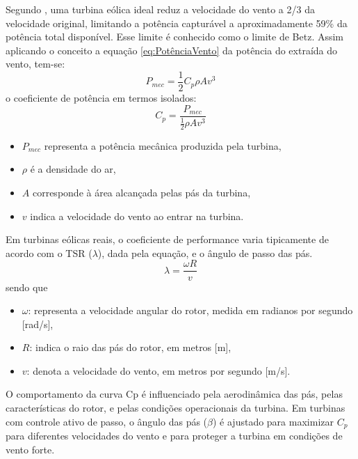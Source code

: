     \par Segundo , uma turbina eólica ideal reduz a velocidade do vento a 2/3 da velocidade original, limitando a potência capturável a aproximadamente 59\% da potência total disponível. Esse limite é conhecido como o limite de Betz. Assim aplicando o conceito a equação \ref{eq:PotênciaVento} da potência do extraída do vento, tem-se:
    \begin{equation}
        P_{mec} = \frac{1}{2} C_p \rho A v^3 
    \end{equation}
    o coeficiente de potência em termos isolados:
    \begin{equation}
        C_p = \frac{P_{mec}}{\frac{1}{2} \rho A v^3}
        \label{eq:CoeficienteDePotência}
    \end{equation}
    \begin{itemize}
        \item \( P_{mec} \) representa a potência mecânica produzida pela turbina,
        \item \( \rho \) é a densidade do ar,
        \item \( A \) corresponde à área alcançada pelas pás da turbina,
        \item \( v \) indica a velocidade do vento ao entrar na turbina.
    \end{itemize}
    \par Em turbinas eólicas reais, o coeficiente de performance varia tipicamente de acordo com o TSR ($\lambda$), dada pela equação, e o ângulo de passo das pás. 
    \begin{equation}
        \lambda = \frac{\omega R}{v}
        \label{eq:lambda}
    \end{equation}
    sendo que
    \begin{itemize}
        \item \( \omega \): representa a velocidade angular do rotor, medida em radianos por segundo [rad/s],
        \item \( R \): indica o raio das pás do rotor, em metros [m],
        \item \( v \): denota a velocidade do vento, em metros por segundo [m/s].
    \end{itemize}
   

    \par O comportamento da curva Cp é influenciado pela aerodinâmica das pás, pelas características do rotor, e pelas condições operacionais da turbina. Em turbinas com controle ativo de passo, o ângulo das pás ($\beta$) é ajustado para maximizar $C_p$ para diferentes velocidades do vento e para proteger a turbina em condições de vento forte.

